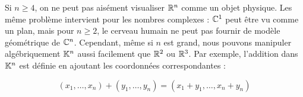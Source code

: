 \documentclass[12pt]{book}
\theoremstyle{plain}
\begin{document}
\indent{}
Si $n\ge 4$, on ne peut pas aisément visualiser $\mathbb{R}^n$ comme un objet physique. Les même problème intervient pour les nombres complexes : $\mathbb{C}^1$ peut être vu comme un plan, mais pour $n\ge 2$, le cerveau humain ne peut pas fournir de modèle géométrique de $\mathbb{C}^n$. Cependant, même si $n$ est grand, nous pouvons manipuler algébriquement $\mathbb{K}^n$ aussi facilement que $\mathbb{R}^2$ ou $\mathbb{R}^3$. Par exemple, l'addition dans $\mathbb{K}^n$ est définie en ajoutant les coordonnées correspondantes :

\begin{equation*}
    (x_1,\ldots,x_n)+(y_1,\ldots,y_n) = (x_1+y_1,\ldots,x_n+y_n)
\end{equation*}
\end{document}
